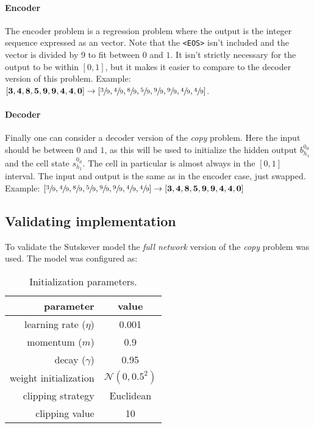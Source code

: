 \paragraph{Encoder} The encoder problem is a regression problem where the output is the integer sequence expressed as an vector. Note that the \texttt{<EOS>} isn't included and the vector is divided by 9 to fit between $0$ and $1$. It isn't strictly necessary for the output to be within $[0, 1]$, but it makes it easier to compare to the decoder version of this problem. Example: $[\mathbf{3}, \mathbf{4}, \mathbf{8}, \mathbf{5}, \mathbf{9}, \mathbf{9}, \mathbf{4}, \mathbf{4}, \mathbf{0}] \rightarrow [\sfrac{3}{9}, \sfrac{4}{9}, \sfrac{8}{9}, \sfrac{5}{9}, \sfrac{9}{9}, \sfrac{9}{9}, \sfrac{4}{9}, \sfrac{4}{9}]$.

\paragraph{Decoder} Finally one can consider a decoder version of the \textit{copy} problem. Here the input should be between $0$ and $1$, as this will be used to initialize the hidden output $b_{h_1}^{0_d}$ and the cell state $s_{h_1}^{0_d}$. The cell in particular is almost always in the $[0, 1]$ interval. The input and output is the same as in the encoder case, just swapped. Example: $[\sfrac{3}{9}, \sfrac{4}{9}, \sfrac{8}{9}, \sfrac{5}{9}, \sfrac{9}{9}, \sfrac{9}{9}, \sfrac{4}{9}, \sfrac{4}{9}] \rightarrow [\mathbf{3}, \mathbf{4}, \mathbf{8}, \mathbf{5}, \mathbf{9}, \mathbf{9}, \mathbf{4}, \mathbf{4}, \mathbf{0}]$

\subsection{Validating implementation}

To validate the Sutskever model the \textit{full network} version of the \textit{copy} problem was used. The model was configured as:

\begin{table}[H]
\centering
\begin{tabular}{r|c}
	parameter & value \\ \hline
	learning rate ($\eta$) & 0.001 \\
	momentum ($m$) & 0.9 \\
	decay ($\gamma$) & 0.95 \\
	weight initialization & $\mathcal{N}(0, 0.5^2)$ \\
	clipping strategy & Euclidean \\
	clipping value & 10
\end{tabular}
\caption{Initialization parameters.}
\end{table}


